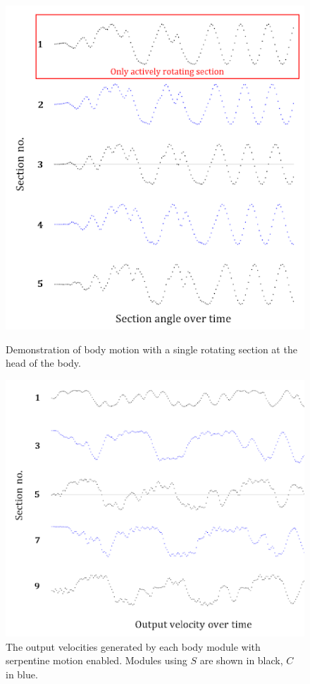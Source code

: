 \documentclass{article}
\begin{document}
\begin{figure}[H]
\begin{minipage}[t]{.4\textwidth}
\centering
\includegraphics[width=1\textwidth]{cpgMirroring}
\caption{Demonstration of body motion with a single rotating section at the head of the body.}
\end{minipage}
\hfill
\begin{minipage}[t]{.5\textwidth}
\centering
\includegraphics[width=1\textwidth]{cpgSerpentine}
\caption{The output velocities generated by each body module with serpentine motion enabled. Modules using $S$ are shown in black, $C$ in blue.}
\end{minipage}
\end{figure}
\end{document}
